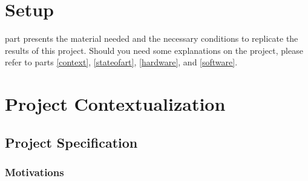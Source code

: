\clearpage
{}

\chapter{Setup}\label{setup}

 part presents the material needed and the 
necessary conditions to replicate the results of
this project. Should you need some explanations on the project, please
refer to parts \vref{context}, \vref{stateofart}, \vref{hardware}, and \vref{software}.

\chapter{Project Contextualization}\label{context}

	\section{Project Specification}
	
		\subsection{Motivations}
	
